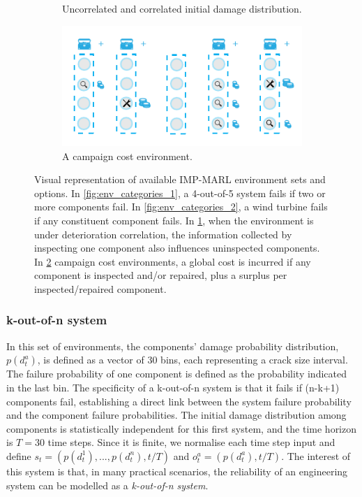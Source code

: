 \begin{figure}
\begin{subfigure}[t]{0.53\textwidth}
    \caption{Uncorrelated and correlated initial damage distribution.}
    \label{fig:env_categories_3}
\end{subfigure}%
\begin{subfigure}[t]{0.47\textwidth}
\centering
    \includegraphics[width=1\linewidth]{tex_thesis/figures/ch5/fig2_mul/environments_v2_d.pdf}
    \caption{A campaign cost environment.}
    \label{fig:env_categories_4}
\end{subfigure}
\caption{
Visual representation of available IMP-MARL environment sets and options.
In \ref{fig:env_categories_1}, a 4-out-of-5 system fails if two or more components fail.
In \ref{fig:env_categories_2}, a wind turbine fails if any constituent component fails.
In \ref{fig:env_categories_3}, when the environment is under deterioration correlation, the information collected by inspecting one component also influences uninspected components.
In \ref{fig:env_categories_4} campaign cost environments, a global cost is incurred if any component is inspected and/or repaired, plus a surplus per inspected/repaired component. 
}
\label{fig:env_categories}
\end{figure}

\subsubsection{k-out-of-n system}
In this set of environments, the components' damage probability distribution, $p(d^a_t)$, is defined as a vector of 30 bins, each representing a crack size interval.
The failure probability of one component is defined as the probability indicated in the last bin.
The specificity of a k-out-of-n system is that it fails if (n-k+1) components fail, establishing a direct link between the system failure probability and the component failure probabilities.
The initial damage distribution among components is statistically independent for this first system, and the time horizon is $T=30$ time steps.
Since it is finite, we normalise each time step input and define $s_t = (p(d^1_t),..., p(d^n_t), t/T)$ and $o^a_t=(p(d^a_t), t/T)$.
The interest of this system is that, in many practical scenarios, the reliability of an engineering system can be modelled as a \textit{k-out-of-n system}.

